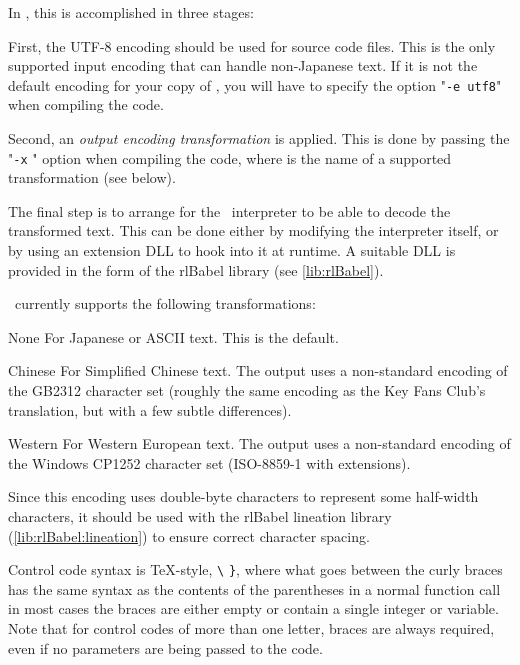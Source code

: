     In \package, this is accomplished in three stages:
    
    First, the UTF-8 encoding should be used for source code files.  This is the 
    only supported input encoding that can handle non-Japanese text.  If it is
    not the default encoding for your copy of \package, you will have to specify
    the option "\texttt{-e utf8}" when compiling the code.
    
    Second, an \emph{output encoding transformation} is applied.  This is done 
    by passing the "\texttt{-x} " option when compiling the code, 
    where  is the name of a supported transformation (see below).
    
    The final step is to arrange for the \reallive\ interpreter to be able to 
    decode the transformed text.  This can be done either by modifying the 
    interpreter itself, or by using an extension DLL to hook into it at 
    runtime.  A suitable DLL is provided in the form of the rlBabel library
    (see \ref{lib:rlBabel}).
    
    \package\ currently supports the following transformations:
    
    \begin{nicelist}
    \item[None]
      For Japanese or ASCII text. This is the default.
    \item[Chinese]
      For Simplified Chinese text. The output uses a non-standard encoding of 
      the GB2312 character set (roughly the same encoding as the Key Fans Club's 
       translation, but with a few subtle differences).
    \item[Western]
      For Western European text. The output uses a non-standard encoding of
      the Windows CP1252 character set (ISO-8859-1 with extensions).
      
      Since this encoding uses double-byte characters to represent some 
      half-width characters, it should be used with the rlBabel lineation 
      library (\ref{lib:rlBabel:lineation}) to ensure correct character spacing.      
    \end{nicelist}


    Control code syntax is \TeX-style, \lstinline|\|%
    \rawlbrace\lstinline|}|, where what goes between the curly braces has the
    same syntax as the contents of the parentheses in a normal function
    call\,\textemdash\,in most cases the braces are either empty or contain a
    single integer or variable.  Note that for control codes of more than one
    letter, braces are always required, even if no parameters are being passed
    to the code.

